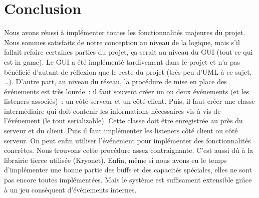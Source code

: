 \chapter{Conclusion}

Nous avons réussi à implémenter toutes les fonctionnalités majeures du projet.
Nous sommes satisfaits de notre conception au niveau de la logique, mais s'il fallait refaire certaines parties du
projet, ça serait au niveau du GUI (tout ce qui est in game). Le GUI a été implémenté tardivement dans le projet
et n'a pas bénéficié d'autant de réflexion que le reste du projet (très peu d'UML à ce sujet, …).
D'autre part, au niveau du réseau, la procédure de mise en place des événements est très lourde :
il faut souvent créer un ou deux événements (et les listeners associés) : un côté serveur et un côté client.
Puis, il faut créer une classe intermédiaire qui doit contenir les informations nécessaires vis à vis de l'événement
(le tout serializable). Cette classe doit être enregistrée au près du serveur et du client.
Puis il faut implémenter les listeners côté client ou côté serveur. On peut enfin utiliser l'événement pour
implémenter des fonctionnalités concrètes. Nous trouvons cette procédure assez contraignante. C'est aussi
dû à la librairie tierce utilisée (Kryonet).
Enfin, même si nous avons eu le temps d'implémenter une bonne partie des buffs et des capacités spéciales,
elles ne sont pas encore toutes implémentées. Mais le système est suffisament extensible grâce à un jeu
conséquent d'événements internes.

